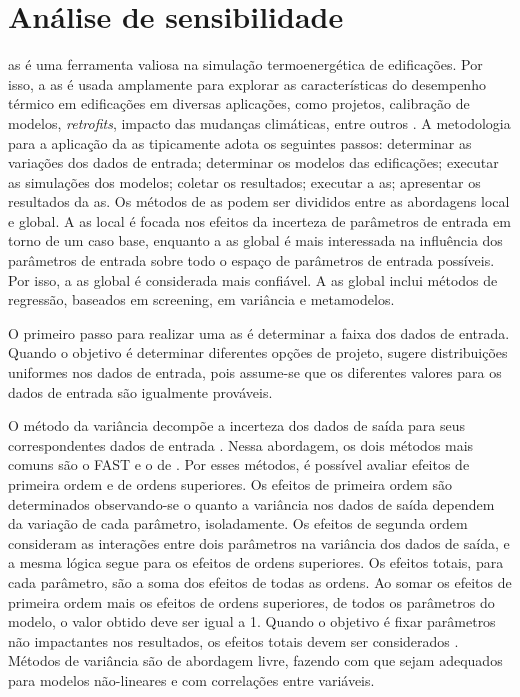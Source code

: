 \documentclass[brazil,hardcopy,openany]{ufscthesis} %
\begin{document}
\section{Análise de sensibilidade}

\Acrfull{as} é uma ferramenta valiosa na simulação termoenergética de edificações. Por isso, a \acrshort{as} é usada amplamente para explorar as características do desempenho térmico em edificações em diversas aplicações, como projetos, calibração de modelos, \textit{retrofits}, impacto das mudanças climáticas, entre outros \cite{Tian2013a}. A metodologia para a aplicação da \acrshort{as} tipicamente adota os seguintes passos: determinar as variações dos dados de entrada; determinar os modelos das edificações; executar as simulações dos modelos; coletar os resultados; executar a \acrshort{as}; apresentar os resultados da \acrshort{as}. Os métodos de \acrshort{as} podem ser divididos entre as abordagens local e global. A \acrshort{as} local é focada nos efeitos da incerteza de parâmetros de entrada em torno de um caso base, enquanto a \acrshort{as} global é mais interessada na influência dos parâmetros de entrada sobre todo o espaço de parâmetros de entrada possíveis. Por isso, a \acrshort{as} global é considerada mais confiável. A \acrshort{as} global inclui métodos de regressão, baseados em screening, em variância e metamodelos.

O primeiro passo para realizar uma \acrshort{as} é determinar a faixa dos dados de entrada. Quando o objetivo é determinar diferentes opções de projeto,   sugere distribuições uniformes nos dados de entrada, pois assume-se que os diferentes valores para os dados de entrada são igualmente prováveis.

O método da variância decompõe a incerteza dos dados de saída para seus correspondentes dados de entrada  \cite{Tian2013a}. Nessa abordagem, os dois métodos mais comuns são o FAST \cite{Saltelli2004} e o de . 
Por esses métodos, é possível avaliar efeitos de primeira ordem e de ordens superiores.
Os efeitos de primeira ordem são determinados observando-se o quanto a variância nos dados de saída dependem da variação de cada parâmetro, isoladamente.
Os efeitos de segunda ordem consideram as interações entre dois parâmetros na variância dos dados de saída, e a mesma lógica segue para os efeitos de ordens superiores.
Os efeitos totais, para cada parâmetro, são a soma dos efeitos de todas as ordens.
Ao somar os efeitos de primeira ordem mais os efeitos de ordens superiores, de todos os parâmetros do modelo, o valor obtido deve ser igual a 1.
Quando o objetivo é fixar parâmetros não impactantes nos resultados, os efeitos totais devem ser considerados \cite{Saltelli2004}. Métodos de variância são de abordagem livre, fazendo com que sejam adequados para modelos não-lineares e com correlações entre variáveis.
\end{document}
